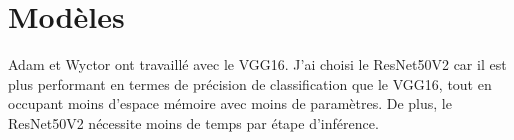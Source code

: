 \documentclass{report}
\begin{document}
{%

\section{Modèles}
\hspace{1.6cm}Adam et Wyctor\cite{Adam21,Wyctor22} ont travaillé avec le VGG16\cite{simonyan2015deep}. J'ai choisi le ResNet50V2\cite{he2016identity} car il est plus performant en termes de précision de classification que le VGG16\cite{simonyan2015deep}, tout en occupant moins d'espace mémoire avec moins de paramètres. De plus, le ResNet50V2 nécessite moins de temps par étape d'inférence\cite{KerasDoc}.

}
\end{document}
